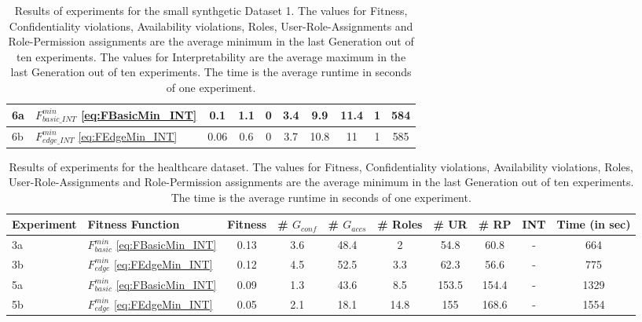 \begin{landscape}
\begin{table}
\begin{tabular}{|l|l|c|c|c|c|c|c|c|c|}
            6a & $F_{basic\_INT}^{min}$ \eqref{eq:FBasicMin_INT}   &   0.1  &   1.1   &   0   &   3.4   &   9.9   &   11.4   &   1   &   584\\ \hline
            6b & $F_{edge\_INT}^{min}$ \eqref{eq:FEdgeMin_INT}   &   0.06   &   0.6   &   0   &   3.7   &   10.8   &   11   &   1   &   585\\ \hline
        \end{tabular}
        \caption{Results of experiments for the small synthgetic Dataset 1. The values for Fitness, Confidentiality violations, Availability violations, Roles, User-Role-Assignments and Role-Permission assignments are the average minimum in the last Generation out of ten experiments. The values for Interpretability are the average maximum in the last Generation out of ten experiments. The time is the average runtime in seconds of one experiment.}
        \label{tab:results_exp2_dataset1}
    \end{table}
    \begin{table}
        \centering
        \begin{tabular}{|l|l|c|c|c|c|c|c|c|c|}
            \hline
            \rowcolor{myGray} 
            \textbf{Experiment} & \textbf{Fitness Function} & \textbf{Fitness} & \textbf{\# $G_{conf}$} & \textbf{\# $G_{accs}$} & \textbf{\# Roles} & \textbf{\# UR} & \textbf{\# RP} & \textbf{INT} & \textbf{Time (in sec)}\\ \hline
            3a & $F_{basic}^{min}$ \eqref{eq:FBasicMin_INT}   &   0.13   &   3.6   &   48.4   &   2   &   54.8   &   60.8   &   -   & 664\\ \hline
            3b & $F_{edge}^{min}$ \eqref{eq:FEdgeMin_INT}   &   0.12   &   4.5   &   52.5   &   3.3   &   62.3   &   56.6   &   -   & 775\\ \hline
            5a & $F_{basic}^{min}$ \eqref{eq:FBasicMin_INT}   &   0.09   &   1.3   &   43.6   &   8.5   &   153.5   &   154.4   &   -   & 1329\\ \hline
            5b & $F_{edge}^{min}$ \eqref{eq:FEdgeMin_INT}   &   0.05   &   2.1   &   18.1   &   14.8   &   155   &   168.6   &   -   & 1554\\ \hline
        \end{tabular}
        \caption{Results of experiments for the healthcare dataset. The values for Fitness, Confidentiality violations, Availability violations, Roles, User-Role-Assignments and Role-Permission assignments are the average minimum in the last Generation out of ten experiments. The time is the average runtime in seconds of one experiment.}
        \label{tab:results_exp2_healthcare}
    \end{table}
\end{landscape}
